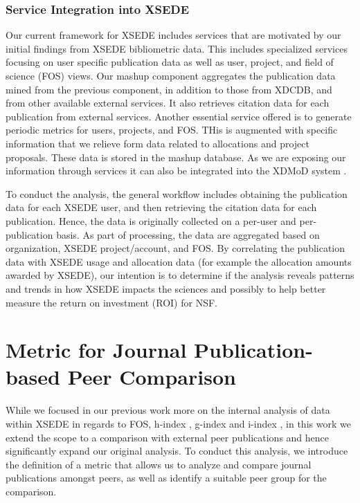 \documentclass{sig-alternate}
\begin{document}
\subsubsection{Service Integration into XSEDE}

Our current framework for XSEDE includes services that are motivated by our initial findings from XSEDE bibliometric data. This includes specialized services focusing on user specific publication data as well as user, project, and field of science (FOS) views. Our mashup component aggregates the publication data mined from the previous component, in addition to those from XDCDB, and from other available external services. It also retrieves citation data for each publication from external services. Another essential service offered is to generate periodic metrics for users, projects, and FOS. THis is augmented with specific information that we relieve form data related to allocations and project proposals. These data is stored in the mashup database. As we are exposing our information through services it can also be integrated into  the XDMoD system \cite{Furlani:2013:UXF:2484762.2484763}.

To conduct the analysis, the general workflow includes obtaining the publication data for each XSEDE user, and then retrieving the citation data for each publication. Hence, the data is originally collected on a per-user and per-publication basis. As part of processing, the data are aggregated based on organization, XSEDE project/account, and FOS.  By correlating the publication data with XSEDE usage and allocation data (for example the allocation amounts awarded by XSEDE), our intention is to determine if the analysis reveals patterns and trends in how XSEDE impacts the sciences and possibly to help better measure the return on investment (ROI) for NSF. 

\section{Metric for Journal Publication-based Peer Comparison} \label{S:metric}

While we focused in our previous work more on the internal analysis of data within XSEDE in regards to FOS, h-index \cite{hirsch2005index}, g-index \cite{www-i10index} and i-index \cite{egghe2006theory}, in this work we extend the scope to a comparison with external peer publications and hence significantly expand our original analysis. To conduct this analysis, we introduce the definition of a metric that allows us to analyze and compare journal publications amongst peers, as well as identify a suitable peer group for the comparison.
\end{document}
